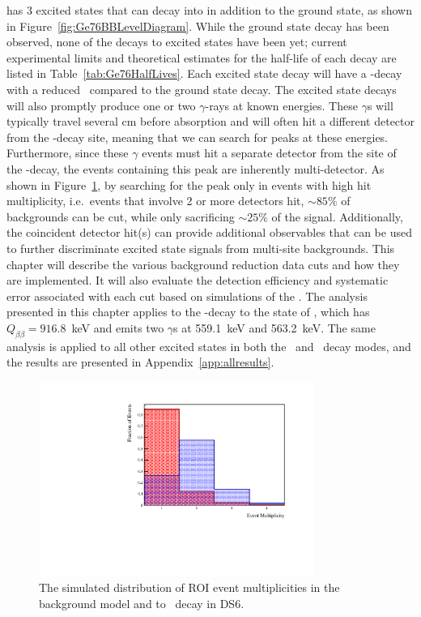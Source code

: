 \documentclass[/main.tex]{subfiles}
\begin{document}
 has 3 excited states that  can decay into in addition to the ground state, as shown in Figure~\ref{fig:Ge76BBLevelDiagram}.
While the ground state decay has been observed, none of the decays to excited states have been yet; current experimental limits and theoretical estimates for the half-life of each decay are listed in Table~\ref{tab:Ge76HalfLives}.
Each excited state decay will have a \bb -decay with a reduced \Qval\ compared to the ground state decay.
The excited state decays will also promptly produce one or two $\gamma$-rays at known energies.
These $\gamma$s will typically travel several cm before absorption and will often hit a different detector from the \bb -decay site, meaning that we can search for peaks at these energies.
Furthermore, since these $\gamma$ events must hit a separate detector from the site of the \bb -decay, the events containing this peak are inherently multi-detector.
As shown in Figure~\ref{fig:multhist}, by searching for the peak only in events with high hit multiplicity, i.e.~events that involve 2 or more detectors hit, ${\sim}85\%$ of backgrounds can be cut, while only sacrificing ${\sim}25$\% of the signal.
Additionally, the coincident detector hit(s) can provide additional observables that can be used to further discriminate excited state signals from multi-site backgrounds.
This chapter will describe the various background reduction data cuts and how they are implemented.
It will also evaluate the detection efficiency and systematic error associated with each cut based on simulations of the \MJD.
The analysis presented in this chapter applies to the \tnbb -decay to the  state of , which has $Q_{\beta\beta}=916.8$~keV and emits two $\gamma$s at 559.1~keV and 563.2~keV.
The same analysis is applied to all other excited states in both the \znbb\ and \tnbb\ decay modes, and the results are presented in Appendix~\ref{app:allresults}.

\begin{figure}[h]
  \centering
  \includegraphics[width=0.8\textwidth]{MultHist}
  \caption[Event Multiplicity in E.S. decay and BG model simulations]{\label{fig:multhist}
    The simulated distribution of ROI event multiplicities in the background model and \bbes to ~decay in DS6.}
\end{figure}
\end{document}
